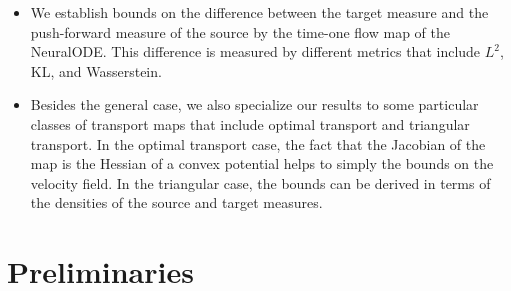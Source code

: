 \begin{itemize}
    \item We establish bounds on the difference between the target measure and the push-forward measure of the source by the time-one flow map of the NeuralODE. This difference is measured by different metrics that include $L^2$, KL, and Wasserstein. 
    
    \item Besides the general case, we also specialize our results to some particular classes of transport maps that include optimal transport and triangular transport. In the optimal transport case, the fact that the Jacobian of the map is the Hessian of a convex potential helps to simply the bounds on the velocity field.  In the triangular case, the bounds can be derived in terms of the densities of the source and target measures.  
    
    
\end{itemize}


\section{Preliminaries}
